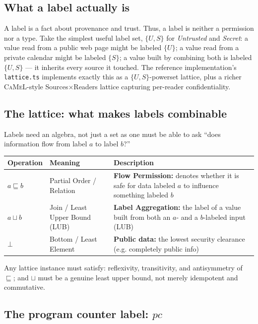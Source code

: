 \documentclass[11pt, a4paper]{article}
\newcommand{\flowsto}{\sqsubseteq}
\newcommand{\joinop}{\sqcup}
\newcommand{\CaMeL}{\textsc{CaMeL}\xspace}
\begin{document}
\subsection{What a label actually is}

A label is a fact about provenance and trust. Thus, a label is neither a
permission nor a type. Take the simplest useful label set, $\{U, S\}$ for
\emph{Untrusted} and \emph{Secret}: a value read from a public web page might
be labeled $\{U\}$; a value read from a private calendar might be labeled
$\{S\}$; a value built by combining both is labeled $\{U, S\}$ --- it inherits
every source it touched. The reference implementation's \texttt{lattice.ts}
implements exactly this as a $\{U,S\}$-powerset lattice, plus a richer
\CaMeL-style Sources$\times$Readers lattice capturing per-reader
confidentiality.

\subsection{The lattice: what makes labels combinable}

Labels need an algebra, not just a set as one must be able to ask ``does
information flow from label $a$ to label $b$?''

\begin{tabular}{@{}p{2cm}p{4.8cm}p{6.7cm}@{}}
\toprule
Operation & Meaning & Description \\
\midrule
$a \flowsto b$ & Partial Order / Relation & \textbf{Flow Permission:} denotes whether it is safe for data labeled $a$ to influence something labeled $b$ \\
$a \joinop b$ & Join / Least Upper Bound (LUB) & \textbf{Label Aggregation:} the label of a value built from both an $a$- and a $b$-labeled input (LUB) \\
$\bot$ & Bottom / Least Element & \textbf{Public data:} the lowest security clearance (e.g. completely public info) \\
\bottomrule
\end{tabular}

Any lattice instance must satisfy: reflexivity, transitivity, and
antisymmetry of $\flowsto$; and $\joinop$ must be a genuine least upper
bound, not merely idempotent and commutative.

\subsection{The program counter label: \texorpdfstring{$pc$}{pc}}
\end{document}
